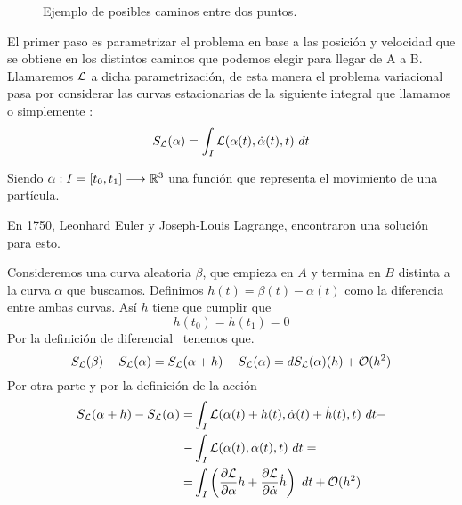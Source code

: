 \begin{figure}[H]
	\centering
	\caption{Ejemplo de posibles caminos entre dos puntos.}
\end{figure}

El primer paso es parametrizar el problema en base a las posición y velocidad que se obtiene en los distintos caminos que podemos elegir para llegar de A a B\@. Llamaremos $\mathcal{L}$ a dicha parametrización, de esta manera el problema variacional pasa por considerar las curvas estacionarias de la siguiente integral que llamamos  o simplemente :
\begin{equation}
	\label{eq:accion}
	S_{\mathcal{L}}(\alpha) = \int_{I}\mathcal{L}(\alpha(t), \dot{\alpha}(t), t)\ dt
\end{equation}

Siendo $\alpha:I=[t_0, t_1]\longrightarrow \mathbb{R}^3$ una función que representa el movimiento de una partícula.

En 1750, Leonhard Euler y Joseph-Louis Lagrange, encontraron una solución para esto.

Consideremos una curva aleatoria $\beta$, que empieza en $A$ y termina en $B$ distinta a la curva $\alpha$ que buscamos. Definimos $h(t) = \beta(t)-\alpha(t)$ como la diferencia entre ambas curvas. Así $h$ tiene que cumplir que
\begin{equation}
	\label{eq:extremos_h}
	h(t_0)=h(t_1)=0
\end{equation}
Por la definición de diferencial~\cite{FV} tenemos que.
\begin{equation*}
	S_{\mathcal{L}}(\beta) -  S_{\mathcal{L}}(\alpha) = S_{\mathcal{L}}(\alpha + h) -  S_{\mathcal{L}}(\alpha) = dS_{\mathcal{L}}(\alpha)(h) +\mathcal{O}(h^2)
\end{equation*}
Por otra parte y por la definición de la acción
\begin{equation*}
	\begin{split}
		S_{\mathcal{L}}(\alpha + h) -  S_{\mathcal{L}}(\alpha) = & \int_{I}\mathcal{L}(\alpha(t)+h(t), \dot{\alpha}(t)+\dot{h}(t), t)\ dt - \\
		- & \int_{I}\mathcal{L}(\alpha(t), \dot{\alpha}(t), t)\ dt =\\
		=& \int_{I}\left( \frac{\partial \mathcal{L}}{\partial\alpha}h+\frac{\partial \mathcal{L}}{\partial\dot{\alpha}}\dot{h}\right)\ dt+\mathcal{O}(h^2)
	\end{split}
\end{equation*}

